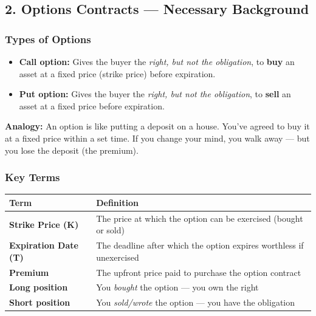 \documentclass[12pt,openany]{book}
\begin{document}
\subsection{2. Options Contracts — Necessary Background}

\subsubsection{Types of Options}

\begin{itemize}[leftmargin=*]
    \item \textbf{Call option:} Gives the buyer the \emph{right, but not the obligation}, to \textbf{buy} an asset at a fixed price (strike price) before expiration.
    \item \textbf{Put option:} Gives the buyer the \emph{right, but not the obligation}, to \textbf{sell} an asset at a fixed price before expiration.
\end{itemize}

\textbf{Analogy:} An option is like putting a deposit on a house. You've agreed to buy it at a fixed price within a set time. If you change your mind, you walk away — but you lose the deposit (the premium).

\subsubsection{Key Terms}

\begin{center}
\scriptsize
\setlength{\tabcolsep}{3pt}
\begin{tabular}{|L{6.3cm}|L{6.3cm}|}
\hline
\textbf{Term} & \textbf{Definition} \\
\hline
\textbf{Strike Price (K)} & The price at which the option can be exercised (bought or sold) \\
\hline
\textbf{Expiration Date (T)} & The deadline after which the option expires worthless if unexercised \\
\hline
\textbf{Premium} & The upfront price paid to purchase the option contract \\
\hline
\textbf{Long position} & You \emph{bought} the option — you own the right \\
\hline
\textbf{Short position} & You \emph{sold/wrote} the option — you have the obligation \\
\hline
\end{tabular}
\end{center}
\end{document}

